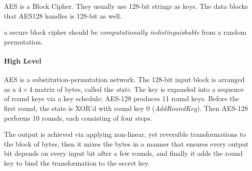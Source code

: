AES is a Block Cipher. They usually use 128-bit strings as keys. The data blocks that AES128 handles is 128-bit as well.

a secure block cipher should be \emph{computationally indistinguishable} from a random permutation.

\paragraph{High Level}
AES is a substitution-permutation network. The 128-bit input block is arranged as a $4 \times 4$ matrix of bytes, called the \emph{state}. The key is expanded into a sequence of round keys via a key schedule; AES-128 produces 11 round keys. Before the first round, the state is XOR'd with round key 0 (\emph{AddRoundKey}). Then AES-128 performs 10 rounds, each consisting of four steps.

The output is achieved via applying non-linear, yet reversible transformations to the block of bytes, then it mixes the bytes in a manner that ensures every output bit depends on every input bit after a few rounds, and finally it adds the round key to bind the transformation to the secret key.


